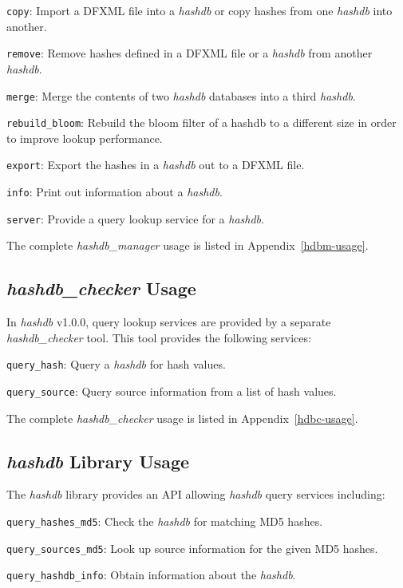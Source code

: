 \documentclass[11pt,twoside]{article}
\newcommand \hdb {\textit{hashdb}\xspace}
\newcommand \hdbm {\textit{hashdb\_manager}\xspace}
\newcommand \hdbc {\textit{hashdb\_checker}\xspace}
\begin{document}
\begin{compactitem}
\item \texttt{copy}: Import a DFXML file into a \hdb
or copy hashes from one \hdb into another.
\item \texttt{remove}: Remove hashes defined in a DFXML file
or a \hdb from another \hdb.
\item \texttt{merge}: Merge the contents of two {\hdb} databases
into a third \hdb.
\item \texttt{rebuild\_bloom}: Rebuild the bloom filter of a hashdb
to a different size in order to improve lookup performance.
\item \texttt{export}: Export the hashes in a \hdb out to a DFXML file.
\item \texttt{info}: Print out information about a \hdb.
\item \texttt{server}: Provide a query lookup service for a \hdb.
\end{compactitem}

The complete \hdbm usage is listed in Appendix~\ref{hdbm-usage}.

\subsection{\hdbc Usage}
In \hdb v1.0.0, query lookup services are provided by a separate \hdbc tool.
This tool provides the following services:

\begin{compactitem}	
\item \texttt{query\_hash}: Query a \hdb for hash values.
\item \texttt{query\_source}: Query source information
from a list of hash values.
\end{compactitem}

The complete \hdbc usage is listed in Appendix~\ref{hdbc-usage}.

\subsection{\hdb Library Usage}
The \hdb library provides an API allowing \hdb query services including:
\begin{compactitem}	
\item \texttt{query\_hashes\_md5}: Check the \hdb for matching MD5 hashes.
\item \texttt{query\_sources\_md5}: Look up source information
for the given MD5 hashes.
\item \texttt{query\_hashdb\_info}: Obtain information about the \hdb.
\end{compactitem}	
\end{document}
